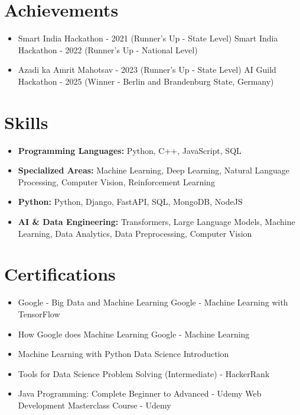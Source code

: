 \documentclass[a4paper,10pt]{article}
\begin{document}
\section*{Achievements}
\begin{itemize}
\item Smart India Hackathon - 2021 (Runner's Up - State Level) \hfill Smart India Hackathon - 2022 (Runner's Up - National Level)
\item Azadi ka Amrit Mahotsav - 2023 (Runner's Up - State Level) \hfill AI Guild Hackathon - 2025 (Winner - Berlin and Brandenburg State, Germany)
\end{itemize}

\section*{Skills}
\begin{itemize}
  \item \textbf{Programming Languages:} Python, C++, JavaScript, SQL
  \item \textbf{Specialized Areas:} Machine Learning, Deep Learning, Natural Language Processing, Computer Vision, Reinforcement Learning
  \item \textbf{Python:} Python, Django, FastAPI, SQL, MongoDB, NodeJS
  \item \textbf{AI \& Data Engineering:} Transformers, Large Language Models, Machine Learning, Data Analytics, Data Preprocessing, Computer Vision
\end{itemize}

\section*{Certifications}
\begin{itemize}
\item Google - Big Data and Machine Learning \hfill Google - Machine Learning with TensorFlow
\item How Google does Machine Learning \hfill Google - Machine Learning
\item Machine Learning with Python \hfill Data Science Introduction
\item Tools for Data Science \hfill Problem Solving (Intermediate) - HackerRank
\item Java Programming: Complete Beginner to Advanced - Udemy \hfill Web Development Masterclass Course - Udemy
\end{itemize}
\end{document}
